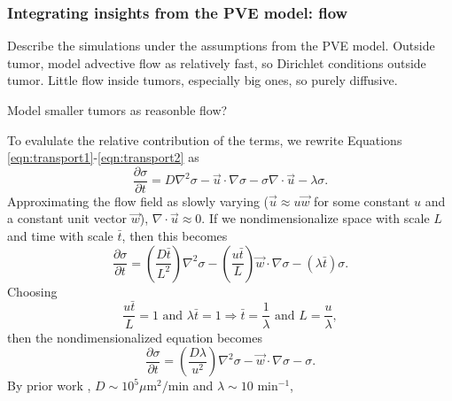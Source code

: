 \documentclass[smallextended,natbib]{svjour3}
\newcommand{\beq}{\begin{equation}}
\newcommand{\eeq}{\end{equation}}
\newcommand{\micron}{\mu\textrm{m}}
\begin{document}
\subsubsection{Integrating insights from the PVE model: flow}
Describe the simulations under the assumptions from the PVE model.  Outside 
tumor, model advective flow as relatively fast, so Dirichlet conditions outside tumor. 
Little flow inside tumors, especially big ones, so purely diffusive. 

Model smaller tumors as reasonble flow?  




To evalulate the relative contribution of the terms, we rewrite Equations \ref{eqn:transport1}-\ref{eqn:transport2} as 
\beq
\frac{ \partial \sigma}{\partial t} = D \nabla^2 \sigma - \vec{u} \cdot \nabla \sigma - \sigma \nabla \cdot \vec{u} - \lambda \sigma. 
\eeq
Approximating the flow field as slowly varying ($\vec{u} \approx u \vec{w}$ for some constant $u$ and a constant 
unit vector $\vec{w}$), $\nabla \cdot \vec{u} \approx 0$. 
%
If we nondimensionalize space %
with scale $L$ and time %
with scale $\bar{t}$, then this becomes 
\beq
\frac{ \partial  \sigma}{\partial t}  =  
\left( \frac{ D \bar t}{ L^2 } \right) \nabla^2 \sigma  - \left(  \frac{u \bar{t} }{L} \right)\vec{w} \cdot \nabla \sigma  - \left( \lambda \bar{t} \right) \sigma. 
\eeq
Choosing 
\beq
\frac{ u \bar{t}}{L } = 1 \textrm{ and } \lambda \bar{t} = 1 
\Longrightarrow \bar{t} = \frac{1}{\lambda} \textrm{ and } L = \frac{ u }{ \lambda }, 
\eeq
then the nondimensionalized equation becomes 
\beq
\frac{ \partial \sigma}{\partial t} = \left( \frac{ D \lambda }{u^2} \right) \nabla^2 \sigma - \vec{w} \cdot \nabla \sigma  - \sigma . 
\eeq
By prior work \citep{ghaffarizadeh15_bioinformatics}, $D \sim 10^5 \micron^2 / \textrm{min}$ and $\lambda \sim 10 \textrm{ min}^{-1}$, 
\end{document}

